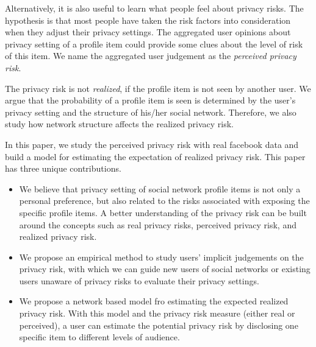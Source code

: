 \documentclass[a4paper]{article}
\begin{document}
Alternatively, it is also useful to learn what people feel about
privacy risks. The hypothesis is that most people have taken the risk
factors into consideration when they adjust their privacy
settings. The aggregated user opinions about privacy setting of a
profile item could provide some clues about the level of risk of this
item. We name the aggregated user judgement as the \emph{perceived
  privacy risk}.

The privacy risk is not \emph{realized}, if the profile item is not
seen by another user. We argue that the probability of a profile item
is seen is determined by the user's privacy setting and the structure
of his/her social network. Therefore, we also study how network
structure affects the realized privacy risk.

In this paper, we study the perceived privacy risk with real facebook
data and build a model for estimating the expectation of realized
privacy risk. This paper has three unique contributions.
\begin{itemize}
\item We believe that privacy setting of social network profile items
  is not only a personal preference, but also related to the risks
  associated with exposing the specific profile items. A better
  understanding of the privacy risk can be built around the concepts
  such as real privacy risks, perceived privacy risk, and realized
  privacy risk.

\item We propose an empirical method to study users' implicit
  judgements on the privacy risk, with which we can guide new users of
  social networks or existing users unaware of privacy risks to
  evaluate their privacy settings.

\item We propose a network based model fro estimating the expected
  realized privacy risk. With this model and the privacy risk measure
  (either real or perceived), a user can estimate the potential
  privacy risk by disclosing one specific item to different levels of
  audience.
\end{itemize}

\end{document}
